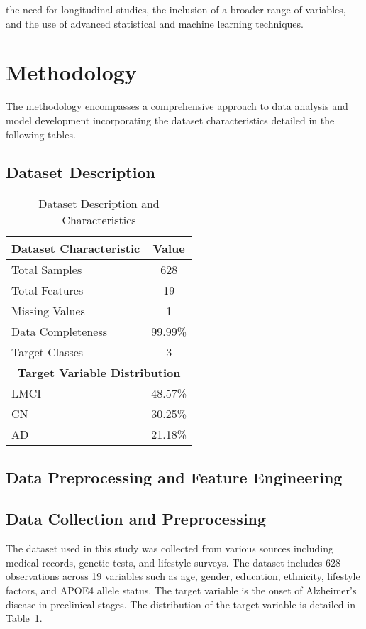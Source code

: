\documentclass[conference]{IEEEtran}
\begin{document}
the need for longitudinal studies, the inclusion of a broader range of variables, and the use of advanced statistical and machine learning techniques.

\section{Methodology}
The methodology encompasses a comprehensive approach to data analysis and model development incorporating the dataset characteristics detailed in the following tables.

\subsection{Dataset Description}

\begin{table}[!h]
\centering
\caption{Dataset Description and Characteristics}
\label{tab:dataset_description}
\begin{tabular}{|l|c|}
\hline
\textbf{Dataset Characteristic} & \textbf{Value} \\
\hline
Total Samples & 628 \\
\hline
Total Features & 19 \\
\hline
Missing Values & 1 \\
\hline
Data Completeness & 99.99\% \\
\hline
Target Classes & 3 \\
\hline
\hline
\multicolumn{2}{|c|}{\textbf{Target Variable Distribution}} \\
\hline
LMCI & 48.57\% \\
\hline
CN & 30.25\% \\
\hline
AD & 21.18\% \\
\hline
\end{tabular}
\end{table}



\subsection{Data Preprocessing and Feature Engineering}
\subsection{Data Collection and Preprocessing}

The dataset used in this study was collected from various sources including medical records, genetic tests, and lifestyle surveys. The dataset includes 628 observations across 19 variables such as age, gender, education, ethnicity, lifestyle factors, and APOE4 allele status. The target variable is the onset of Alzheimer's disease in preclinical stages. The distribution of the target variable is detailed in Table~\ref{tab:dataset_description}.
\end{document}
